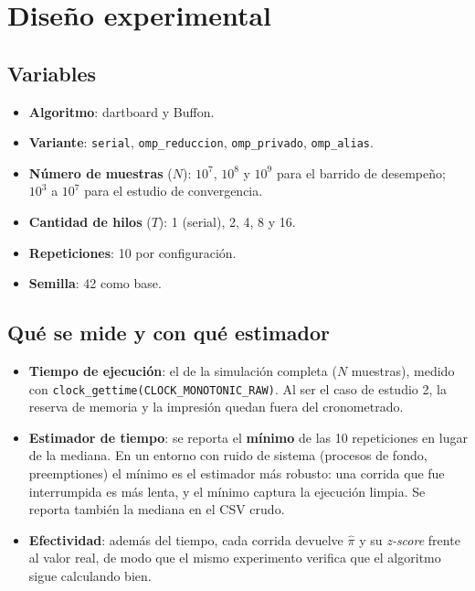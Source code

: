 \section{Diseño experimental}

\subsection{Variables}

\begin{itemize}
    \item \textbf{Algoritmo}: dartboard y Buffon.
    \item \textbf{Variante}: \texttt{serial}, \texttt{omp\_reduccion}, \texttt{omp\_privado}, \texttt{omp\_alias}.
    \item \textbf{Número de muestras} ($N$): $10^7$, $10^8$ y $10^9$ para el barrido de desempeño; $10^3$ a $10^7$ para el estudio de convergencia.
    \item \textbf{Cantidad de hilos} ($T$): 1 (serial), 2, 4, 8 y 16.
    \item \textbf{Repeticiones}: 10 por configuración.
    \item \textbf{Semilla}: 42 como base.
\end{itemize}

\subsection{Qué se mide y con qué estimador}

\begin{itemize}
    \item \textbf{Tiempo de ejecución}: el de la simulación completa ($N$ muestras), medido con \texttt{clock\_gettime(CLOCK\_MONOTONIC\_RAW)}. Al ser el caso de estudio 2, la reserva de memoria y la impresión quedan fuera del cronometrado.
    \item \textbf{Estimador de tiempo}: se reporta el \textbf{mínimo} de las 10 repeticiones en lugar de la mediana. En un entorno con ruido de sistema (procesos de fondo, preemptiones) el mínimo es el estimador más robusto: una corrida que fue interrumpida es más lenta, y el mínimo captura la ejecución limpia. Se reporta también la mediana en el CSV crudo.
    \item \textbf{Efectividad}: además del tiempo, cada corrida devuelve $\hat\pi$ y su \emph{z-score} frente al valor real, de modo que el mismo experimento verifica que el algoritmo sigue calculando bien.
\end{itemize}

